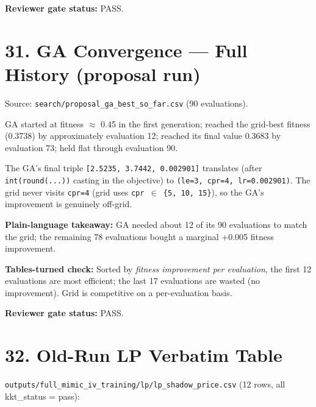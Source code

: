 \documentclass{article}
\begin{document}
\textbf{Reviewer gate status:} PASS.



\clearpage
\section{31. GA Convergence --- Full History (proposal run)}


Source: \texttt{search/proposal\_ga\_best\_so\_far.csv} (90 evaluations).


GA started at fitness \ensuremath{\approx} 0.45 in the first generation; reached the grid-best fitness (0.3738) by approximately evaluation 12; reached its final value 0.3683 by evaluation 73; held flat through evaluation 90.


The GA's final triple \texttt{[2.5235, 3.7442, 0.002901]} translates (after \texttt{int(round(...))} casting in the objective) to \texttt{(le=3, cpr=4, lr=0.002901)}. The grid never visits \texttt{cpr=4} (grid uses \texttt{cpr \ensuremath{\in} \{5, 10, 15\}}), so the GA's improvement is genuinely off-grid.


\textbf{Plain-language takeaway:} GA needed about 12 of its 90 evaluations to match the grid; the remaining 78 evaluations bought a marginal +0.005 fitness improvement.


\textbf{Tables-turned check:} Sorted by \emph{fitness improvement per evaluation}, the first 12 evaluations are most efficient; the last 17 evaluations are wasted (no improvement). Grid is competitive on a per-evaluation basis.


\textbf{Reviewer gate status:} PASS.



\clearpage
\section{32. Old-Run LP Verbatim Table}


\texttt{outputs/full\_mimic\_iv\_training/lp/lp\_shadow\_price.csv} (12 rows, all kkt\_status = pass):
\end{document}
